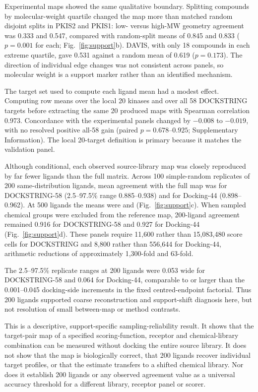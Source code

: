 \documentclass[11pt]{article}
\begin{document}
Experimental maps showed the same qualitative boundary. Splitting compounds by
molecular-weight quartile changed the map more than matched random disjoint splits in PKIS2
and PKIS1: low- versus high-MW geometry agreement was 0.333 and 0.547, compared with
random-split means of 0.845 and 0.833 ($p=0.001$ for each; Fig.~\ref{fig:support}b). DAVIS,
with only 18 compounds in each extreme quartile, gave 0.531 against a random mean of 0.619
($p=0.173$). The direction of individual edge changes was not consistent across panels, so
molecular weight is a support marker rather than an identified mechanism.

The target set used to compute each ligand mean had a modest effect. Computing row means
over the local 20 kinases and over all 58 DOCKSTRING targets before extracting the same 20
produced maps with Spearman correlation 0.973. Concordance with the experimental panels
changed by $-0.008$ to $-0.019$, with no resolved positive all-58 gain (paired
$p=0.678$--$0.925$; Supplementary Information). The local 20-target definition is primary
because it matches the validation panel.

Although conditional, each observed source-library map was closely reproduced by far fewer ligands
than the full matrix. Across 100 simple-random replicates of 200 same-distribution ligands,
mean agreement with the full map was \DsProbeTwoHundred{} for DOCKSTRING-58
(2.5--97.5\% range 0.885--0.938) and \DffProbeTwoHundred{} for Docking-44
(0.898--0.962). At 500 ligands the means were \DsProbeFiveHundred{} and
\DffProbeFiveHundred{} (Fig.~\ref{fig:support}c). When sampled chemical groups were
excluded from the reference map, 200-ligand agreement remained 0.916 for DOCKSTRING-58 and
0.927 for Docking-44 (Fig.~\ref{fig:support}d). These panels require 11,600 rather than
15,083,480 score cells for DOCKSTRING and 8,800 rather than 556,644 for Docking-44,
arithmetic reductions of approximately 1,300-fold and 63-fold.

The 2.5--97.5\% replicate ranges at 200 ligands were 0.053 wide for DOCKSTRING-58 and 0.064
for Docking-44, comparable to or larger than the 0.001--0.045 docking-side increments in the
fixed centred-endpoint factorial.
Thus 200 ligands supported coarse reconstruction and support-shift diagnosis here, but not
resolution of small between-map or method contrasts.

This is a descriptive, support-specific sampling-reliability result. It shows that the target-pair map of a specified
scoring-function, receptor and chemical-library combination can be measured without docking
the entire source library. It does not show that the map is biologically correct, that 200
ligands recover individual target profiles, or that the estimate transfers to a shifted
chemical library. Nor does it establish 200 ligands or any observed agreement value as a
universal accuracy threshold for a different library, receptor panel or scorer.
\end{document}
